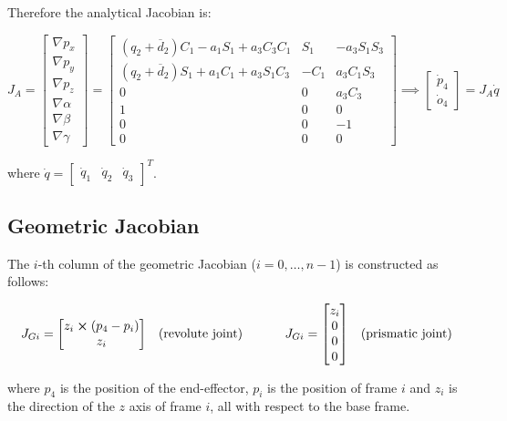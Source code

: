 Therefore the analytical Jacobian is:

\begin{equation*}
J_A = \begin{bmatrix}
\nabla p_x\\\nabla p_y\\\nabla p_z\\\nabla\alpha\\\nabla\beta\\\nabla\gamma
\end{bmatrix}=\begin{bmatrix}
(q_2+\overline d_2)C_1-a_1S_1+a_3C_3C_1 &  S_1 & -a_3S_1S_3\\
(q_2+\overline d_2)S_1+a_1C_1+a_3S_1C_3 &  -C_1 & a_3C_1S_3\\
0 & 0 & a_3C_3\\
1 & 0 & 0\\
0 & 0 & -1\\
0 & 0 & 0
\end{bmatrix}\implies\begin{bmatrix}
\dot p_4\\\dot o_4\end{bmatrix} = J_A\dot q
\end{equation*}

where $\dot q = \begin{bmatrix}
\dot q_1 & \dot q_2 & \dot q_3
\end{bmatrix}^T$.

\subsection{Geometric Jacobian}

The $i$-th column of the geometric Jacobian ($i=0,\dots,n-1$) is constructed as follows:

\begin{equation*}
J_{Gi} = \begin{bmatrix}
z_i\cross (p_4-p_i)\\ z_i
\end{bmatrix}\;\;\;\text{(revolute joint)}\;\;\;\;\;\;\;\;\;\;\;\;
J_{Gi} = \begin{bmatrix}
z_i\\ 0\\0\\0
\end{bmatrix}\;\;\;\text{(prismatic joint)}
\end{equation*}

where $p_4$ is the position of the end-effector, $p_i$ is the position of frame $i$ and $z_i$ is the direction of the $z$ axis of frame $i$, all with respect to the base frame.

